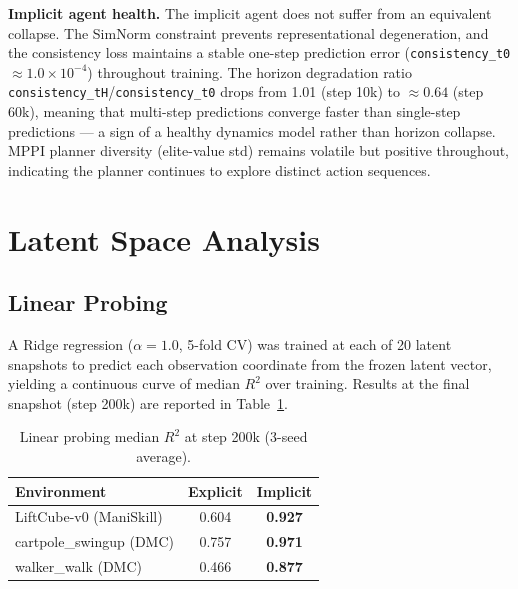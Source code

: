 \documentclass{article}
\begin{document}
\textbf{Implicit agent health.}
The implicit agent does not suffer from an equivalent collapse.
The SimNorm constraint prevents representational degeneration, and the consistency loss
maintains a stable one-step prediction error (\texttt{consistency\_t0}$\approx 1.0
\times 10^{-4}$) throughout training.
The horizon degradation ratio \texttt{consistency\_tH}/\texttt{consistency\_t0} drops
from 1.01 (step 10k) to $\approx 0.64$ (step 60k), meaning that multi-step predictions
converge faster than single-step predictions — a sign of a healthy dynamics model rather
than horizon collapse.
MPPI planner diversity (elite-value std) remains volatile but positive throughout,
indicating the planner continues to explore distinct action sequences.

\section{Latent Space Analysis}
\label{sec:analysis}

\subsection{Linear Probing}

A Ridge regression ($\alpha=1.0$, 5-fold CV) was trained at each of 20 latent
snapshots to predict each observation coordinate from the frozen latent vector,
yielding a continuous curve of median $R^2$ over training.
Results at the final snapshot (step 200k) are reported in Table~\ref{tab:probing}.

\begin{table}[h]
\caption{Linear probing median $R^2$ at step 200k (3-seed average).}
\label{tab:probing}
\vskip 0.1in
\begin{center}
\begin{small}
\begin{sc}
\begin{tabular}{lcc}
\toprule
Environment              & Explicit & Implicit \\
\midrule
LiftCube-v0 (ManiSkill) & 0.604    & \textbf{0.927} \\
cartpole\_swingup (DMC) & 0.757    & \textbf{0.971} \\
walker\_walk (DMC)      & 0.466    & \textbf{0.877} \\
\bottomrule
\end{tabular}
\end{sc}
\end{small}
\end{center}
\vskip -0.1in
\end{table}
\end{document}
